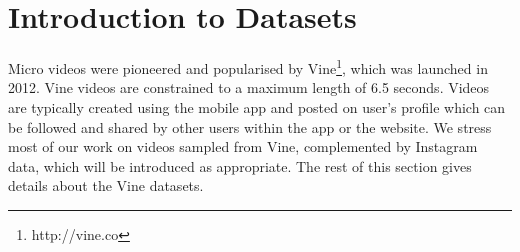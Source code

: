 \section{Introduction to Datasets}
Micro videos were pioneered and popularised by Vine\footnote{\scriptsize http://vine.co}, which was launched in 2012. Vine videos are constrained to a maximum length of 6.5 seconds. Videos are typically created using the mobile app and posted on user's profile which can be followed and shared by other users within the app or the website. %
We stress most of our work on videos sampled from Vine, complemented by %
 Instagram data, which will be introduced as appropriate. The rest of this section gives details about the Vine datasets.
%
%

